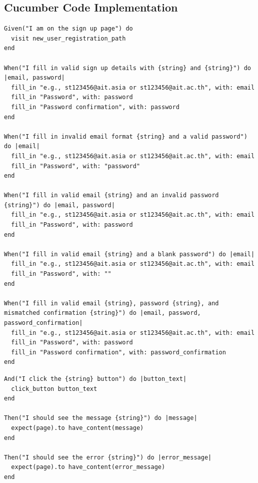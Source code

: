 \subsection{Cucumber Code Implementation}

\begin{lstlisting}
Given("I am on the sign up page") do
  visit new_user_registration_path
end

When("I fill in valid sign up details with {string} and {string}") do |email, password|
  fill_in "e.g., st123456@ait.asia or st123456@ait.ac.th", with: email
  fill_in "Password", with: password
  fill_in "Password confirmation", with: password
end

When("I fill in invalid email format {string} and a valid password") do |email|
  fill_in "e.g., st123456@ait.asia or st123456@ait.ac.th", with: email
  fill_in "Password", with: "password"
end

When("I fill in valid email {string} and an invalid password {string}") do |email, password|
  fill_in "e.g., st123456@ait.asia or st123456@ait.ac.th", with: email
  fill_in "Password", with: password
end

When("I fill in valid email {string} and a blank password") do |email|
  fill_in "e.g., st123456@ait.asia or st123456@ait.ac.th", with: email
  fill_in "Password", with: ""
end

When("I fill in valid email {string}, password {string}, and mismatched confirmation {string}") do |email, password, password_confirmation|
  fill_in "e.g., st123456@ait.asia or st123456@ait.ac.th", with: email
  fill_in "Password", with: password
  fill_in "Password confirmation", with: password_confirmation
end
    \end{lstlisting}

    \begin{lstlisting}
And("I click the {string} button") do |button_text|
  click_button button_text
end

Then("I should see the message {string}") do |message|
  expect(page).to have_content(message)
end

Then("I should see the error {string}") do |error_message|
  expect(page).to have_content(error_message)
end
    \end{lstlisting}